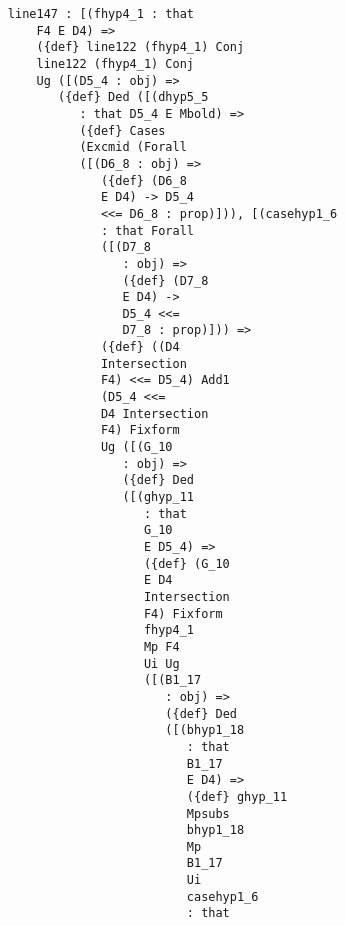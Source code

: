 \documentclass[12pt]{article}
\begin{document}
\begin{verbatim}
                  line147 : [(fhyp4_1 : that 
                      F4 E D4) => 
                      ({def} line122 (fhyp4_1) Conj 
                      line122 (fhyp4_1) Conj 
                      Ug ([(D5_4 : obj) => 
                         ({def} Ded ([(dhyp5_5 
                            : that D5_4 E Mbold) => 
                            ({def} Cases 
                            (Excmid (Forall 
                            ([(D6_8 : obj) => 
                               ({def} (D6_8 
                               E D4) -> D5_4 
                               <<= D6_8 : prop)])), [(casehyp1_6 
                               : that Forall 
                               ([(D7_8 
                                  : obj) => 
                                  ({def} (D7_8 
                                  E D4) -> 
                                  D5_4 <<= 
                                  D7_8 : prop)])) => 
                               ({def} ((D4 
                               Intersection 
                               F4) <<= D5_4) Add1 
                               (D5_4 <<= 
                               D4 Intersection 
                               F4) Fixform 
                               Ug ([(G_10 
                                  : obj) => 
                                  ({def} Ded 
                                  ([(ghyp_11 
                                     : that 
                                     G_10 
                                     E D5_4) => 
                                     ({def} (G_10 
                                     E D4 
                                     Intersection 
                                     F4) Fixform 
                                     fhyp4_1 
                                     Mp F4 
                                     Ui Ug 
                                     ([(B1_17 
                                        : obj) => 
                                        ({def} Ded 
                                        ([(bhyp1_18 
                                           : that 
                                           B1_17 
                                           E D4) => 
                                           ({def} ghyp_11 
                                           Mpsubs 
                                           bhyp1_18 
                                           Mp 
                                           B1_17 
                                           Ui 
                                           casehyp1_6 
                                           : that 

\end{verbatim}
\end{document}
